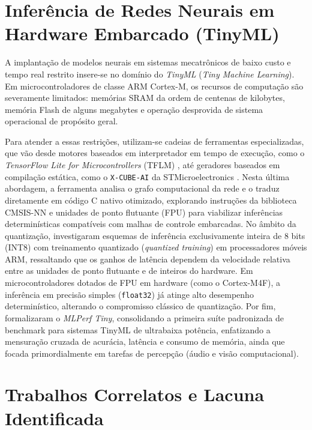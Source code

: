 \section{Inferência de Redes Neurais em Hardware Embarcado (TinyML)}
\label{sec:fund_tinyml}

A implantação de modelos neurais em sistemas mecatrônicos de baixo custo e tempo real restrito insere-se no domínio do \textit{TinyML} (\textit{Tiny Machine Learning}). Em microcontroladores de classe ARM Cortex-M, os recursos de computação são severamente limitados: memórias SRAM da ordem de centenas de kilobytes, memória Flash de alguns megabytes e operação desprovida de sistema operacional de propósito geral.

Para atender a essas restrições, utilizam-se cadeias de ferramentas especializadas, que vão desde motores baseados em interpretador em tempo de execução, como o \textit{TensorFlow Lite for Microcontrollers} (TFLM) \cite{david2021}, até geradores baseados em compilação estática, como o \texttt{X-CUBE-AI} da STMicroelectronics \cite{stmu2526}. Nesta última abordagem, a ferramenta analisa o grafo computacional da rede e o traduz diretamente em código C nativo otimizado, explorando instruções da biblioteca CMSIS-NN e unidades de ponto flutuante (FPU) para viabilizar inferências determinísticas compatíveis com malhas de controle embarcadas. No âmbito da quantização,  investigaram esquemas de inferência exclusivamente inteira de 8 bits (INT8) com treinamento quantizado (\textit{quantized training}) em processadores móveis ARM, ressaltando que os ganhos de latência dependem da velocidade relativa entre as unidades de ponto flutuante e de inteiros do hardware. Em microcontroladores dotados de FPU em hardware (como o Cortex-M4F), a inferência em precisão simples (\texttt{float32}) já atinge alto desempenho determinístico, alterando o compromisso clássico de quantização. Por fim,  formalizaram o \textit{MLPerf Tiny}, consolidando a primeira suíte padronizada de benchmark para sistemas TinyML de ultrabaixa potência, enfatizando a mensuração cruzada de acurácia, latência e consumo de memória, ainda que focada primordialmente em tarefas de percepção (áudio e visão computacional).

\section{Trabalhos Correlatos e Lacuna Identificada}
\label{sec:fund_correlatos}

